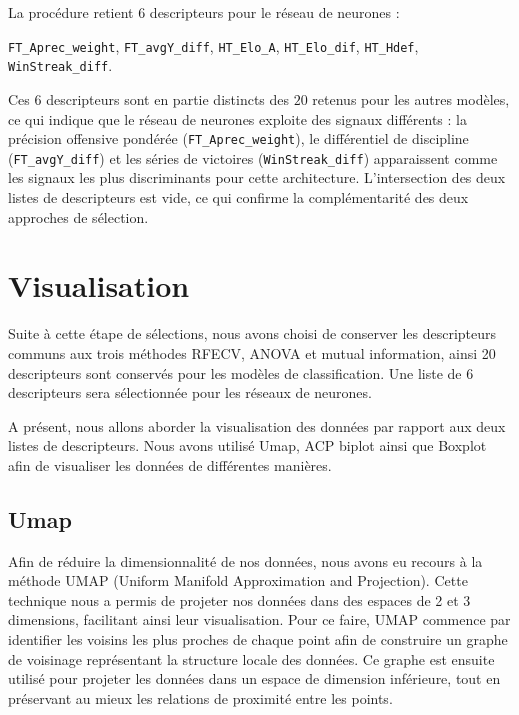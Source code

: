 La procédure retient $6$ descripteurs pour le réseau de neurones :

\begin{center}
\texttt{FT\_Aprec\_weight},
\texttt{FT\_avgY\_diff},
\texttt{HT\_Elo\_A},
\texttt{HT\_Elo\_dif},
\texttt{HT\_Hdef},
\texttt{WinStreak\_diff}.
\end{center}

Ces $6$ descripteurs sont en partie distincts des $20$ retenus pour les autres modèles,
ce qui indique que le réseau de neurones exploite des signaux différents : la précision
offensive pondérée (\texttt{FT\_Aprec\_weight}), le différentiel de discipline
(\texttt{FT\_avgY\_diff}) et les séries de victoires (\texttt{WinStreak\_diff})
apparaissent comme les signaux les plus discriminants pour cette architecture.
L'intersection des deux listes de descripteurs est vide, ce qui confirme la complémentarité
des deux approches de sélection.

\section{Visualisation}
\label{sec:visu}
Suite à cette étape de sélections, nous avons choisi de conserver les descripteurs communs 
aux trois méthodes RFECV, ANOVA et mutual information, ainsi 20 descripteurs sont 
conservés pour les modèles de classification.
\newline 
Une liste de 6 descripteurs sera sélectionnée pour les réseaux de neurones.

A présent, nous allons aborder la visualisation des données par rapport aux deux listes de 
descripteurs. Nous avons utilisé Umap, ACP biplot ainsi que Boxplot afin de visualiser les 
données de différentes manières.

\subsection{Umap}

Afin de réduire la dimensionnalité de nos données, nous avons eu recours à la méthode 
UMAP (Uniform Manifold Approximation and Projection). Cette technique nous a permis 
de projeter nos données dans des espaces de 2 et 3 dimensions, facilitant ainsi leur 
visualisation. Pour ce faire, UMAP commence par identifier les voisins les plus 
proches de chaque point afin de construire un graphe de voisinage représentant la 
structure locale des données. Ce graphe est ensuite utilisé pour projeter les 
données dans un espace de dimension inférieure, tout en préservant au mieux 
les relations de proximité entre les points.


